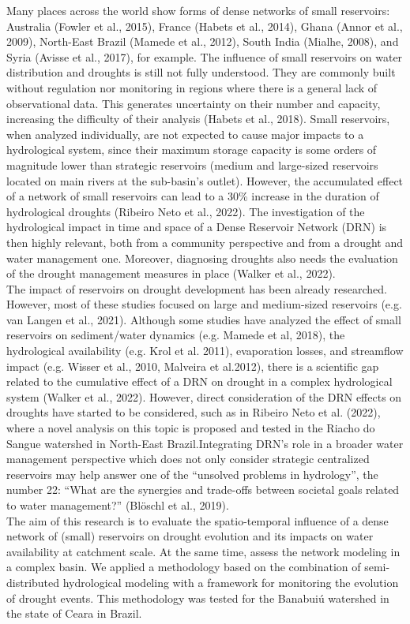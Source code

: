 \documentclass[draft]{agujournal2019}
\begin{document}
Many places across the world show forms of dense networks of small reservoirs: Australia (Fowler et al., 2015), France (Habets et al., 2014), Ghana (Annor et al., 2009), North-East Brazil (Mamede et al., 2012), South India (Mialhe, 2008), and Syria (Avisse et al., 2017), for example. The influence of small reservoirs on water distribution and droughts is still not fully understood. They are commonly built without regulation nor monitoring in regions where there is a general lack of observational data. This generates uncertainty on their number and capacity, increasing the difficulty of their analysis (Habets et al., 2018). Small reservoirs, when analyzed individually, are not expected to cause major impacts to a hydrological system, since their maximum storage capacity is some orders of magnitude lower than strategic reservoirs (medium and large-sized reservoirs located on main rivers at the sub-basin’s outlet). However, the accumulated effect of a network of small reservoirs can lead to a 30\% increase in the duration of hydrological droughts (Ribeiro Neto et al., 2022). The investigation of the hydrological impact in time and space of a Dense Reservoir Network (DRN) is then highly relevant, both from a community perspective and from a drought and water management one. Moreover, diagnosing droughts also needs the evaluation of the drought management measures in place (Walker et al., 2022).\\
The impact of reservoirs on drought development has been already researched. However, most of these studies focused on large and medium-sized reservoirs (e.g. van Langen et al., 2021). Although some studies have analyzed the effect of small reservoirs on sediment/water dynamics (e.g. Mamede et al, 2018), the hydrological availability (e.g. Krol et al. 2011), evaporation losses, and streamflow impact (e.g. Wisser et al., 2010, Malveira et al.2012), there is a scientific gap related to the cumulative effect of a DRN on drought in a complex hydrological system (Walker et al., 2022). However, direct consideration of the DRN effects on droughts have started to be considered, such as in Ribeiro Neto et al. (2022), where a novel analysis on this topic is proposed and tested in the Riacho do Sangue watershed in North-East Brazil.Integrating DRN's role in a broader water management perspective which does not only consider strategic centralized reservoirs may help answer one of the “unsolved problems in hydrology”, the number 22: “What are the synergies and trade-offs between societal goals related to water management?” (Blöschl et al., 2019).\\
The aim of this research is to evaluate the spatio-temporal influence of a dense network of (small) reservoirs on drought evolution and its impacts on water availability at catchment scale. At the same time, assess the network modeling in a complex basin. We applied a methodology based on the combination of semi-distributed hydrological modeling with a framework for monitoring the evolution of drought events. This methodology was tested for the Banabuiú watershed in the state of Ceara in Brazil.
\end{document}
